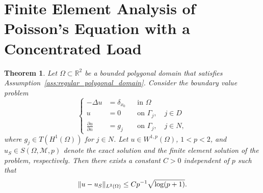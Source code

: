 \documentclass[english, 12pt, a4paper, sci, utf8, a-2b, online]{aaltothesis}
\theoremstyle{definition}
\theoremstyle{plain}
\newtheorem{theorem}{Theorem}[section]
\DeclarePairedDelimiter\norm{\lVert}{\rVert}
\numberwithin{equation}{section}
\begin{document}
\clearpage

\section{Finite Element Analysis of Poisson's Equation with a Concentrated Load}
\label{sec:finite_element_solutions_with_a_concentrated_load}

\begin{theorem}
    \label{thm:L2_convergence_of_p_version_dirac_load}
    Let $\Omega \subset \mathbb{R}^2$ be a bounded polygonal domain
    that satisfies Assumption~\ref{ass:regular_polygonal_domain}.
    Consider the boundary value problem
    \begin{equation*}
        \left\{
            \begin{aligned}
                -\Delta u &= \delta_{x_0} && \text{in } \Omega \\
                u &= 0 && \text{on } \Gamma_j, \quad j \in D \\
                \frac{\partial u}{\partial n} &= g_j && \text{on } \Gamma_j,
                \quad j \in N,
            \end{aligned}
        \right.
    \end{equation*}
    where $g_j \in T(H^1(\Omega))$ for $j \in N$.
    Let $u \in W^{1,p}(\Omega)$, $1 < p < 2$, and $u_S \in S(\Omega,\mathcal{M},p)$
    denote the exact solution and the finite element solution of the problem,
    respectively. Then there exists a constant $C > 0$ independent of $p$
    such that
    \begin{equation*}
        \norm{u - u_S}_{L^2(\Omega)} \leq C p^{-1} \sqrt{\log(p+1)}.
    \end{equation*}
\end{theorem}
\end{document}

